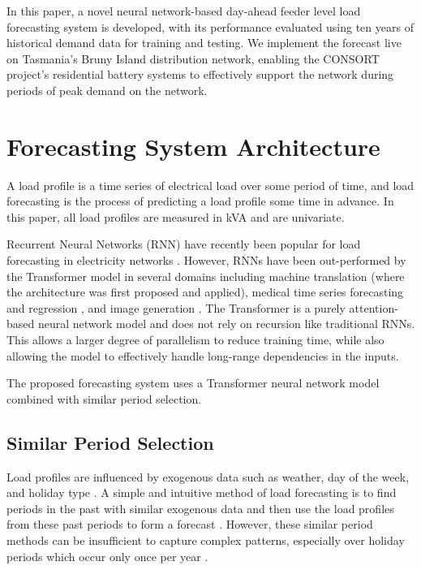 \documentclass[conference]{IEEEtran}
\begin{document}
In this paper, a novel neural network-based day-ahead feeder level load forecasting system is developed, with its performance evaluated using ten years of historical demand data for training and testing. We implement the forecast live on Tasmania's Bruny Island distribution network, enabling the CONSORT project's residential battery systems to effectively support the network during periods of peak demand on the network.

\section{Forecasting System Architecture}
A load profile is a time series of electrical load over some period of time, and load forecasting is the process of predicting a load profile some time in advance.
In this paper, all load profiles are measured in kVA and are univariate.

Recurrent Neural Networks (RNN) have recently been popular for load forecasting in electricity networks \cite{Kong2018}.
However, RNNs have been out-performed by the Transformer \cite{Vaswani2017} model in several domains including machine translation \cite{Vaswani2017} (where the architecture was first proposed and applied), medical time series forecasting and regression \cite{Song2017}, and image generation \cite{Parmar2018}.
The Transformer is a purely attention-based neural network model and does not rely on recursion like traditional RNNs.
This allows a larger degree of parallelism to reduce training time, while also allowing the model to effectively handle long-range dependencies in the inputs.

The proposed forecasting system uses a Transformer neural network model combined with similar period selection.


\subsection{Similar Period Selection} \label{simperiod}
Load profiles are influenced by exogenous data such as weather, day of the week, and holiday type \cite{Weron2006}.
A simple and intuitive method of load forecasting is to find periods in the past with similar exogenous data and then use the load profiles from these past periods to form a forecast \cite{Senjyu1998}.
However, these similar period methods can be insufficient to capture complex patterns, especially over holiday periods which occur only once per year \cite{Chen2010}.

\end{document}
